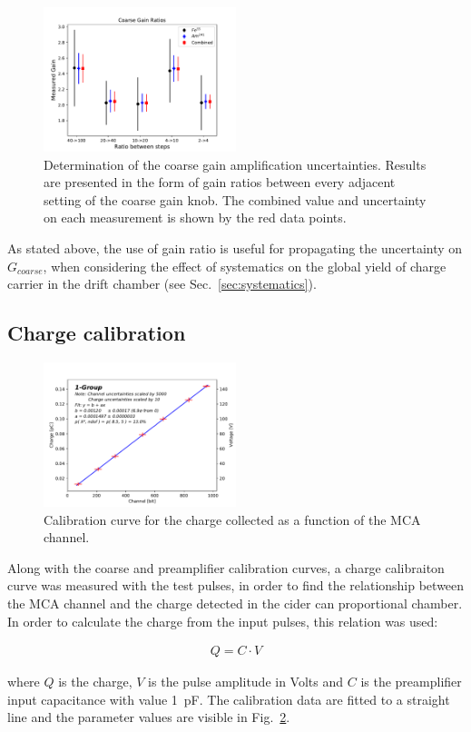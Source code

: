\begin{figure}[htb]
  \includegraphics[width=0.5\textwidth]{graphics/coarse_gain_calibration.pdf}
  \caption{Determination of the coarse gain amplification uncertainties. Results are presented in the form of gain ratios between every adjacent setting of the coarse gain knob. The combined value and uncertainty on each measurement is shown by the red data points.}
  \label{fig:coarse_gain}
\end{figure}


As stated above, the use of gain ratio is useful for propagating the uncertainty on $G_{coarse}$, when considering the effect of systematics on the global yield of charge carrier in the drift chamber (see Sec.~\ref{sec:systematics}).

\subsection{Charge calibration}

\begin{figure}[htb]
  \includegraphics[width=0.5\textwidth]{graphics/chargevschannel.pdf}
  \caption{Calibration curve for the charge collected as a function of the MCA channel.}
  \label{fig:charge_calibration}
\end{figure}

Along with the coarse and preamplifier calibration curves, a charge calibraiton curve was measured with the test pulses, in order to find the relationship between the MCA channel and the charge detected in the cider can proportional chamber. In order to calculate the charge from the input pulses, this relation was used:

\begin{align}
Q = C \cdot V
\end{align}

where $Q$ is the charge, $V$ is the pulse amplitude in Volts and $C$ is the preamplifier input capacitance with value \SI{1}{pF}.
The calibration data are fitted to a straight line and the parameter values are visible in Fig.~\ref{fig:charge_calibration}.



